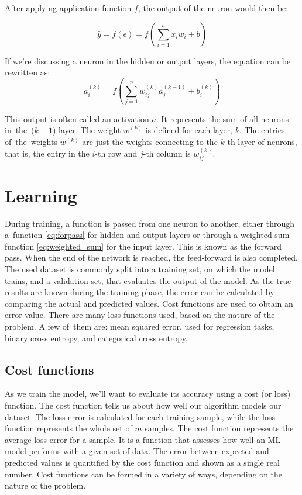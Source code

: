 After applying application function $f$, the output of the neuron would then be: 

\begin{equation}
	\hat{y} = f (\epsilon) = f \left( \sum_{i=1}^{n} x_i w_i + b \right)
	\label{eq:forpass}
\end{equation}


If we're discussing a neuron in the hidden or output layers, the equation can be rewritten as:
\begin{equation}
	a_i^{(k)} = f\left(\sum_{j=1}^{n} w_{ij}^{(k)} a_j^{(k-1)} + b_i^{(k)}\right)
	\label{eq:forpasshidden}
\end{equation}


This output is often called an activation $a$. It represents the sum of all neurons in~the~($k-1$) layer. The weight $w^{(k)}$ is defined for each layer, $k$. The entries of~the~weights $w^{(k)}$ are just the weights connecting to the $k$-th layer of neurons, that is, the entry in the $i$-th row and $j$-th column is $w^{(k)}_{ij}$.


\section{Learning}

During training, a function is passed from one neuron to another, either through a~function \ref{eq:forpass} for hidden and output layers or through a weighted sum function \ref{eq:weighted_sum} for the input layer. This is known as the forward pass. When the end of the network is reached, the feed-forward is also completed.\newline
The used dataset is commonly split into a training set, on which the model trains, and a validation set, that evaluates the output of the model. 
As the true results are known during the training phase, the error can be calculated by comparing the actual and predicted values. Cost functions are used to obtain an error value.\newline
There are many loss functions used, based on the nature of the problem. A few of~them are: mean squared error, used for regression tasks, binary cross entropy, and categorical cross entropy.
\subsection{Cost functions}
As we train the model, we’ll want to evaluate its accuracy using a cost (or loss) function. The cost function tells us about how well our algorithm models our dataset. The loss error is calculated for each training sample, while the loss function represents the whole set of $m$ samples. The cost function represents the average loss error for a sample. It is a function that assesses how well an ML model performs with a given set of data. The error between expected and predicted values is quantified by the cost function and shown as a single real number. Cost functions can be formed in a variety of ways, depending on the nature of the problem.
